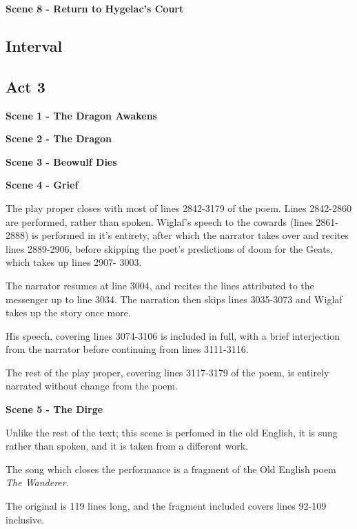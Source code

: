 \documentclass[a4paper]{article}
\begin{document}
{\centerline{\textbf{Scene 8 - Return to Hygelac's Court}}

\subsection{Interval}%

\subsection{Act 3}%

\centerline{\textbf{Scene 1 - The Dragon Awakens}}

\centerline{\textbf{Scene 2 - The Dragon}}

\centerline{\textbf{Scene 3 - Beowulf Dies}}

\centerline{\textbf{Scene 4 - Grief}}

The play proper closes with most of lines 2842-3179 of the poem.
Lines 2842-2860 are performed, rather than spoken.  
Wiglaf's speech to the cowards (lines 2861-2888) is performed in it's entirety, 
after which the narrator takes over and recites lines 2889-2906, before skipping 
the poet's predictions of doom for the Geats, which takes up lines 2907- 3003.

The narrator resumes at line 3004, and recites the lines attributed to the 
messenger up to line 3034. The narration then skips lines 3035-3073 and Wiglaf takes up 
the story once more.

His speech, covering lines 3074-3106 is included in full, with a brief interjection
from the narrator before continuing from lines 3111-3116.

The rest of the play proper, covering lines 3117-3179 of the poem, is entirely 
narrated without change from the poem.

\centerline{\textbf{Scene 5 - The Dirge}}

Unlike the rest of the text; this scene is perfomed in the old English, it is sung 
rather than spoken, and it is taken from a different work.

The song which closes the performance is a fragment of the Old English poem \textit{The Wanderer}.

The original is 119 lines long, and the fragment included covers lines 92-109 inclusive.

}
\end{document}
